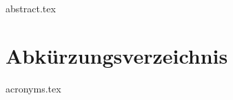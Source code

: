 \clearpage
\section*{}
{abstract.tex}
\thispagestyle{empty}
\pagebreak

\clearpage
\renewcommand{\contentsname}{Inhaltsverzeichnis}
\tableofcontents
\thispagestyle{empty}
\pagebreak

\listoffigures
\pagebreak

\listoftables
\pagebreak

\cleardoublepage
\section*{Abkürzungsverzeichnis}
\begin{acronym}
{acronyms.tex}
\end{acronym}
\pagebreak

